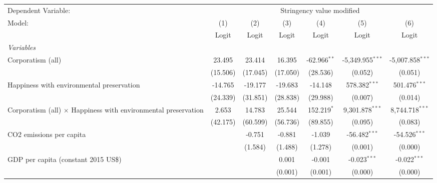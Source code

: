 
\begingroup
\centering
\begin{tabular}{lcccccc}
   \toprule
   Dependent Variable: & \multicolumn{6}{c}{Stringency value modified}\\
   Model:                                                                & (1)      & (2)      & (3)      & (4)             & (5)                & (6)\\  
                                                                         &  Logit   & Logit    & Logit    & Logit           & Logit              & Logit\\  
   \midrule
   \emph{Variables}\\
   Corporatism (all)                                                     & 23.495   & 23.414   & 16.395   & -62.966$^{**}$  & -5,349.955$^{***}$ & -5,007.858$^{***}$\\   
                                                                         & (15.506) & (17.045) & (17.050) & (28.536)        & (0.052)            & (0.051)\\   
   Happiness with environmental preservation                             & -14.765  & -19.177  & -19.683  & -14.148         & 578.382$^{***}$    & 501.476$^{***}$\\   
                                                                         & (24.339) & (31.851) & (28.838) & (29.988)        & (0.007)            & (0.014)\\   
   Corporatism (all) $\times$ Happiness with environmental preservation  & 2.653    & 14.783   & 25.544   & 152.219$^{*}$   & 9,301.878$^{***}$  & 8,744.718$^{***}$\\   
                                                                         & (42.175) & (60.599) & (56.736) & (89.855)        & (0.095)            & (0.083)\\   
   CO2 emissions per capita                                              &          & -0.751   & -0.881   & -1.039          & -56.482$^{***}$    & -54.526$^{***}$\\   
                                                                         &          & (1.584)  & (1.488)  & (1.278)         & (0.001)            & (0.000)\\   
   GDP per capita (constant 2015 US\$)                                   &          &          & 0.001    & -0.001          & -0.023$^{***}$     & -0.022$^{***}$\\   
                                                                         &          &          & (0.001)  & (0.001)         & (0.000)            & (0.000)\\   

\end{tabular}
